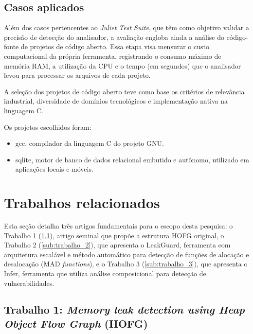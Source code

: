 \documentclass[
    12pt,                %
    openright,           %
    oneside,             %
    a4paper,             %
    english,             %
    brazil               %
]{abntex2}
\begin{document}
\subsection{Casos aplicados}
\label{sub:casos_aplicados}

\par
Além dos casos pertencentes ao \textit{Juliet Test Suite}, que têm como objetivo validar a precisão de detecção do analisador, a avaliação engloba ainda a análise do código-fonte de projetos de código aberto. Essa etapa visa mensurar o custo computacional da própria ferramenta, 
registrando o consumo máximo de memória RAM, a utilização da CPU e o tempo (em segundos) que o analisador levou para processar os arquivos de cada projeto.

\par
A seleção dos projetos de código aberto teve como base os critérios de relevância industrial, diversidade de domínios tecnológicos e implementação nativa na linguagem C.

\par
Os projetos escolhidos foram:
\begin{itemize}
\item gcc, compilador da linguagem C do projeto GNU.
\item sqlite, motor de banco de dados relacional embutido e autônomo, utilizado em aplicações locais e móveis.
\end{itemize}

\section{Trabalhos relacionados}
\label{sec:trabalhos_relacionados}

Esta seção detalha três artigos fundamentais para o escopo desta pesquisa: o Trabalho 1 (\ref{sub:trabalho_1}), artigo seminal que propõe a estrutura HOFG original, o Trabalho 2 (\ref{sub:trabalho_2}), 
que apresenta o LeakGuard, ferramenta com arquitetura escalável e método automático para detecção de funções de alocação e desalocação (MAD \textit{functions}), e o Trabalho 3 (\ref{sub:trabalho_3}), 
que apresenta o Infer, ferramenta que utiliza análise composicional para detecção de vulnerabilidades.

\subsection{Trabalho 1: \textit{Memory leak detection using Heap Object Flow Graph} (HOFG)}
\label{sub:trabalho_1}
\end{document}
